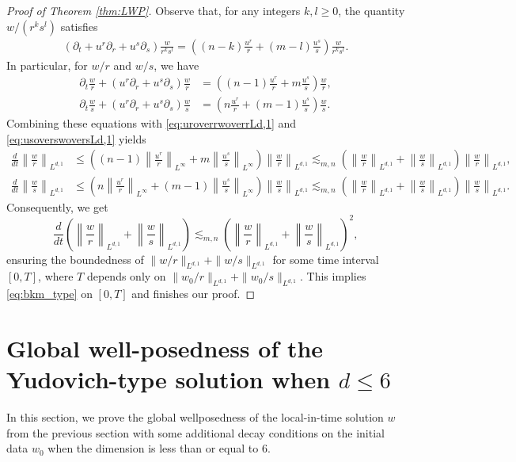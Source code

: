 \documentclass[11pt]{amsart}
\theoremstyle{definition}
\theoremstyle{remark}
\numberwithin{equation}{section}
\numberwithin{equation}{section}
\newcommand{\rd}{\partial}
\newcommand{\0}{\emptyset}
\newcommand{\ift}{\infty}
\begin{document}
\begin{proof}[Proof of Theorem \ref{thm:LWP}]
Observe that, for any integers $k,l \ge 0$, the quantity $w/(r^ks^l)$ satisfies		
\begin{align}
	\left( \partial_t + u^r \partial_r + u^s \partial_s\right)\frac{w}{r^ks^l} = \left( (n-k)\frac{u^r}{r} + (m-l)\frac{u^s}{s} \right) \frac{w}{r^ks^l}.
\end{align}
In particular, for $w/r$ and $w/s$, we have	
\begin{align}
	\rd_{t}\frac{w}{r}+(u^{r}\rd_{r}+u^{s}\rd_{s})\frac{w}{r}&=\left( (n-1)\frac{u^r}{r} + m\frac{u^s}{s} \right) \frac{w}{r},\\
	\rd_{t}\frac{w}{s}+(u^{r}\rd_{r}+u^{s}\rd_{s})\frac{w}{s}&=\left( n\frac{u^r}{r} + (m-1)\frac{u^s}{s} \right) \frac{w}{s}.
\end{align}
Combining these equations with \eqref{eq:uroverrwoverrLd,1} and \eqref{eq:usoverswoversLd,1} yields 
\begin{align}
	\frac{d}{dt} \left\| \frac{w}{r}\right\|_{L^{d,1}}&\leq \left( (n-1) \left\| \frac{u^{r}}{r}\right\|_{L^{\ift}} + m\left\| \frac{u^{s}}{s}\right\|_{L^{\ift}} \right) \left\| \frac{w}{r}\right\|_{L^{d,1}}\lesssim_{m,n} \left( \left\| \frac{w}{r}\right\|_{L^{d,1}} + \left\| \frac{w}{s}\right\|_{L^{d,1}} \right) \left\| \frac{w}{r}\right\|_{L^{d,1}},\\
	\frac{d}{dt} \left\| \frac{w}{s}\right\|_{L^{d,1}}&\leq \left( n \left\| \frac{u^{r}}{r}\right\|_{L^{\ift}} + (m-1)\left\| \frac{u^{s}}{s}\right\|_{L^{\ift}} \right) \left\| \frac{w}{s}\right\|_{L^{d,1}}\lesssim_{m,n} \left( \left\| \frac{w}{r}\right\|_{L^{d,1}} + \left\| \frac{w}{s}\right\|_{L^{d,1}} \right) \left\| \frac{w}{s}\right\|_{L^{d,1}}.
\end{align}
Consequently,	we get	
\begin{equation}
	\frac{d}{dt}\left( \left\| \frac{w}{r}\right\|_{L^{d,1}}+\left\| \frac{w}{s}\right\|_{L^{d,1}}\right)\lesssim_{m,n}\left( \left\| \frac{w}{r}\right\|_{L^{d,1}}+\left\| \frac{w}{s}\right\|_{L^{d,1}}\right)^{2},
\end{equation}
ensuring the boundedness of $\|w/r\|_{L^{d,1}}+\|w/s\|_{L^{d,1}}$ for some time interval $[0,T]$, where $T$ depends only on $\|w_0/r\|_{L^{d,1}}+\|w_0/s\|_{L^{d,1}}$. This implies \eqref{eq:bkm_type} on $[0,T]$ and finishes our proof.

\end{proof}

	
	\section{Global well-posedness of the Yudovich-type solution when $d\leq 6$}\label{sec:gwp}
	In this section, we prove the global wellposedness of the local-in-time solution $w$ from the previous section with some additional decay conditions on the initial data $w_{0}$ when the dimension is less than or equal to $6$.
	
\end{document}
